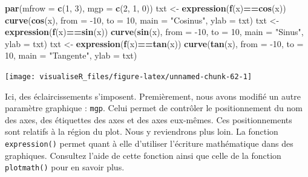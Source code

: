 \documentclass[]{article}
\newenvironment{Shaded}{\begin{snugshade}}{\end{snugshade}}
\newcommand{\DataTypeTok}[1]{\textcolor[rgb]{0.13,0.29,0.53}{#1}}
\newcommand{\DecValTok}[1]{\textcolor[rgb]{0.00,0.00,0.81}{#1}}
\newcommand{\KeywordTok}[1]{\textcolor[rgb]{0.13,0.29,0.53}{\textbf{#1}}}
\newcommand{\NormalTok}[1]{#1}
\newcommand{\OperatorTok}[1]{\textcolor[rgb]{0.81,0.36,0.00}{\textbf{#1}}}
\newcommand{\StringTok}[1]{\textcolor[rgb]{0.31,0.60,0.02}{#1}}
\begin{document}
\begin{Shaded}
\begin{Highlighting}[]
\KeywordTok{par}\NormalTok{(}\DataTypeTok{mfrow =} \KeywordTok{c}\NormalTok{(}\DecValTok{1}\NormalTok{, }\DecValTok{3}\NormalTok{), }\DataTypeTok{mgp =} \KeywordTok{c}\NormalTok{(}\DecValTok{2}\NormalTok{, }\DecValTok{1}\NormalTok{, }\DecValTok{0}\NormalTok{))}
\NormalTok{txt <-}\StringTok{ }\KeywordTok{expression}\NormalTok{(}\KeywordTok{f}\NormalTok{(x)}\OperatorTok{==}\KeywordTok{cos}\NormalTok{(x))}
\KeywordTok{curve}\NormalTok{(}\KeywordTok{cos}\NormalTok{(x), }\DataTypeTok{from =} \DecValTok{-10}\NormalTok{, }\DataTypeTok{to =} \DecValTok{10}\NormalTok{, }\DataTypeTok{main =} \StringTok{"Cosinus"}\NormalTok{, }\DataTypeTok{ylab =}\NormalTok{ txt)}
\NormalTok{txt <-}\StringTok{ }\KeywordTok{expression}\NormalTok{(}\KeywordTok{f}\NormalTok{(x)}\OperatorTok{==}\KeywordTok{sin}\NormalTok{(x))}
\KeywordTok{curve}\NormalTok{(}\KeywordTok{sin}\NormalTok{(x), }\DataTypeTok{from =} \DecValTok{-10}\NormalTok{, }\DataTypeTok{to =} \DecValTok{10}\NormalTok{, }\DataTypeTok{main =} \StringTok{"Sinus"}\NormalTok{, }\DataTypeTok{ylab =}\NormalTok{ txt)}
\NormalTok{txt <-}\StringTok{ }\KeywordTok{expression}\NormalTok{(}\KeywordTok{f}\NormalTok{(x)}\OperatorTok{==}\KeywordTok{tan}\NormalTok{(x))}
\KeywordTok{curve}\NormalTok{(}\KeywordTok{tan}\NormalTok{(x), }\DataTypeTok{from =} \DecValTok{-10}\NormalTok{, }\DataTypeTok{to =} \DecValTok{10}\NormalTok{, }\DataTypeTok{main =} \StringTok{"Tangente"}\NormalTok{, }\DataTypeTok{ylab =}\NormalTok{ txt)}
\end{Highlighting}
\end{Shaded}

\begin{center}\texttt{[image: visualiseR\_files/figure-latex/unnamed-chunk-62-1]} \end{center}

Ici, des éclaircissements s'imposent. Premièrement, nous avons modifié un autre paramètre graphique : \texttt{mgp}. Celui permet de contrôler le positionnement du nom des axes, des étiquettes des axes et des axes eux-mêmes. Ces positionnements sont relatifs à la région du plot. Nous y reviendrons plus loin.
La fonction \texttt{expression()} permet quant à elle d'utiliser l'écriture mathématique dans des graphiques. Consultez l'aide de cette fonction ainsi que celle de la fonction \texttt{plotmath()} pour en savoir plus.
\end{document}
